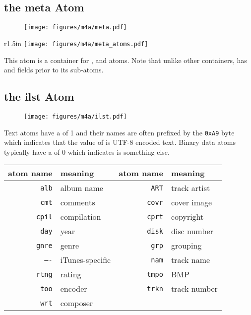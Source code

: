 \subsection{the meta Atom}
\label{atom:meta}
\begin{figure}[h]
  \texttt{[image: figures/m4a/meta.pdf]}
\end{figure}
\begin{wrapfigure}[3]{r}{1.5in}
  \texttt{[image: figures/m4a/meta\_atoms.pdf]}
\end{wrapfigure}
\par
\noindent
This atom is a container for
\hyperref[atom:hdlr]{},
\hyperref[atom:ilst]{} and
\hyperref[atom:free]{} atoms.
Note that unlike other containers,  has 
and  fields prior to its sub-atoms.

\clearpage

\subsection{the ilst Atom}
\label{atom:ilst}
\begin{figure}[h]
  \texttt{[image: figures/m4a/ilst.pdf]}
\end{figure}
\par
\noindent
Text  atoms have a  of 1
and their names are often prefixed by the \texttt{0xA9} byte
which indicates that the value of  is UTF-8 encoded text.
Binary data atoms typically have a  of 0
which indicates  is something else.
\begin{table}[h]
  \begin{tabular}{rlrl}
    \textsf{atom name} & meaning & \textsf{atom name} & meaning \\
    \hline
    \texttt{alb} & album name & \texttt{ART} & track artist \\
    \texttt{cmt} & comments & \texttt{covr} & cover image \\
    \texttt{cpil} & compilation & \texttt{cprt} & copyright \\
    \texttt{day} & year & \texttt{disk} & disc number \\
    \texttt{gnre} & genre & \texttt{grp} & grouping \\
    \texttt{----} & iTunes-specific & \texttt{nam} & track name \\
    \texttt{rtng} & rating & \texttt{tmpo} & BMP \\
    \texttt{too} & encoder & \texttt{trkn} & track number \\
    \texttt{wrt} & composer \\
  \end{tabular}
\end{table}

